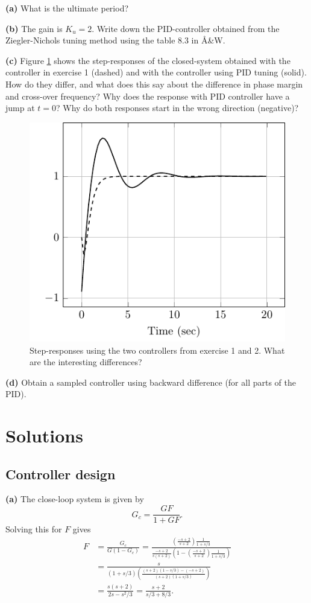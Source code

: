 \documentclass{scrartcl}
\begin{document}
  \textbf{(a)} What is the ultimate period?

  \textbf{(b)} The gain is $K_u=2$. Write down the PID-controller obtained from the Ziegler-Nichols tuning method using the table 8.3 in Å\&W.

  \textbf{(c)} Figure \ref{fig:step} shows the step-responses of the closed-system obtained with the controller in exercise 1 (dashed) and with the controller using PID tuning (solid). How do they differ, and what does this say about the difference in phase margin and cross-over frequency? Why does the response with PID controller have a jump at $t=0$? Why do both responses start in the wrong direction (negative)?
  \begin{figure}
  \begin{center}
  \includegraphics[width=0.5\linewidth]{bode-nonminstep}
  \end{center}
  \caption{Step-responses using the two controllers from exercise 1 and 2. What are the interesting differences?}
  \label{fig:step}
  \end{figure}

 
  \textbf{(d)} Obtain a sampled controller using backward difference (for all parts of the PID). 
  
\section{Solutions}
\label{sec-3}
\subsection{Controller design}
\label{sec-3-1}

   \textbf{(a)}
The close-loop system is given by
\[ G_c = \frac{GF}{1+GF}. \]
Solving this for $F$ gives
\begin{align*}
 F &= \frac{G_c}{G(1-G_c)} = \frac{ \left( \frac{-s+2}{s+2} \right) \frac{1}{1+s/3} } { \frac{-s+2}{s(s+2)}\left(1 - \left( \frac{-s+2}{s+2} \right) \frac{1}{1+s/3}\right)}\\
   &=  \frac{s}{(1+s/3)\left(\frac{(s+2)(1-s/3) - (-s+2)}{(s+2)(1+s/3)}\right)}\\
   &= \frac{s(s+2)}{2s - s^2/3} = \frac{s+2}{s/3 + 8/3}.
\end{align*}
\end{document}
